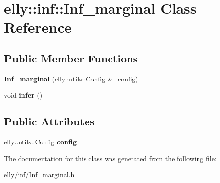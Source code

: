 \hypertarget{classelly_1_1inf_1_1_inf__marginal}{\section{elly\-:\-:inf\-:\-:Inf\-\_\-marginal Class Reference}
\label{classelly_1_1inf_1_1_inf__marginal}
}
\subsection*{Public Member Functions}
\begin{DoxyCompactItemize}
\item 
\hypertarget{classelly_1_1inf_1_1_inf__marginal_a88b096021a5bc98c61d5cea48a13bd81}{{\bfseries Inf\-\_\-marginal} (\hyperlink{classelly_1_1utils_1_1_config}{elly\-::utils\-::\-Config} \&\-\_\-config)}\label{classelly_1_1inf_1_1_inf__marginal_a88b096021a5bc98c61d5cea48a13bd81}

\item 
\hypertarget{classelly_1_1inf_1_1_inf__marginal_a3fe923c918a521ed610e9aa9dfb436e1}{void {\bfseries infer} ()}\label{classelly_1_1inf_1_1_inf__marginal_a3fe923c918a521ed610e9aa9dfb436e1}

\end{DoxyCompactItemize}
\subsection*{Public Attributes}
\begin{DoxyCompactItemize}
\item 
\hypertarget{classelly_1_1inf_1_1_inf__marginal_a262c619f92f892d41b855f429b1ba225}{\hyperlink{classelly_1_1utils_1_1_config}{elly\-::utils\-::\-Config} {\bfseries config}}\label{classelly_1_1inf_1_1_inf__marginal_a262c619f92f892d41b855f429b1ba225}

\end{DoxyCompactItemize}


The documentation for this class was generated from the following file\-:\begin{DoxyCompactItemize}
\item 
elly/inf/Inf\-\_\-marginal.\-h\end{DoxyCompactItemize}
